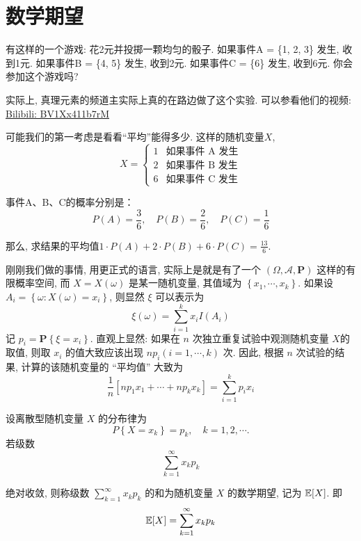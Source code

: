 \section{数学期望}

有这样的一个游戏: 花2元并投掷一颗均匀的骰子. 如果事件A = \{1, 2, 3\} 发生, 收到1元. 如果事件B = \{4, 5\} 发生, 收到2元. 如果事件C = \{6\} 发生, 收到6元. 你会参加这个游戏吗?

\begin{webaside}
    实际上, 真理元素的频道主实际上真的在路边做了这个实验. 可以参看他们的视频: \href{https://www.bilibili.com/video/BV1Xx411b7rM}{Bilibili: BV1Xx411b7rM}
\end{webaside}

可能我们的第一考虑是看看``平均''能得多少. 这样的随机变量$X$, \[
    X =
    \begin{cases}
    1 & \text{如果事件 A 发生} \\
    2 & \text{如果事件 B 发生} \\
    6 & \text{如果事件 C 发生}
    \end{cases}
    \]
    
    事件A、B、C的概率分别是：
    \[P(A) = \frac{3}{6}, \quad P(B) = \frac{2}{6}, \quad P(C) = \frac{1}{6}\]
    
    那么, 求结果的平均值$1 \cdot P(A) + 2 \cdot P(B) + 6 \cdot P(C)= \frac{13}{6}$.

    刚刚我们做的事情, 用更正式的语言, 实际上是就是有了一个 $(\Omega, \mathscr{A}, \mathbf{P})$ 这样的有限概率空间, 而 $X=X(\omega)$ 是某一随机变量, 其值域为 $\left\{x_1, \cdots, x_k\right\}$. 如果设 $A_i=\left\{\omega: X(\omega)=x_i\right\}$, 则显然 $\xi$ 可以表示为
    $$
    \xi(\omega)=\sum_{i=1}^k x_i I\left(A_i\right)
    $$记 $p_i=\mathbf{P}\left\{\xi=x_i\right\}$. 直观上显然: 如果在 $n$ 次独立重复试验中观测随机变量 $X$的取值, 则取 $x_i$ 的值大致应该出现 $n p_i(i=1, \cdots, k)$ 次. 
    因此, 根据 $n$ 次试验的结果, 计算的该随机变量的 “平均值” 大致为
    $$
    \frac{1}{n}\left[n p_1 x_1+\cdots+n p_k x_k\right]=\sum_{i=1}^k p_i x_i
    $$

    \begin{definition}[离散型随机变量的期望]
        设离散型随机变量 $X$ 的分布律为
        $$
        P\left\{X=x_k\right\}=p_k, \quad k=1,2, \cdots .
        $$
        若级数
    $$
    \sum_{k=1}^{\infty} x_k p_k
    $$
    
    绝对收敛, 则称级数 $\sum_{k=1}^{\infty} x_k p_k$ 的和为随机变量 $X$ 的数学期望, 记为 $\mathbb E[X]$. 即
    $$
    \mathbb E[X]=\sum_{k=1}^{\infty} x_k p_k
    $$
    \end{definition}

